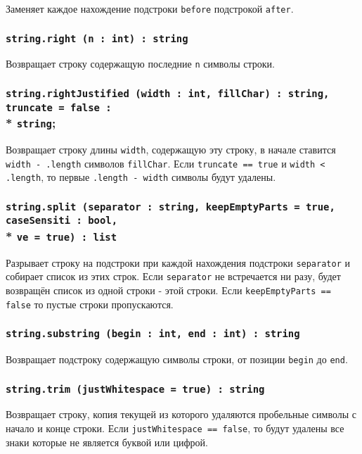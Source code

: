 Заменяет каждое нахождение подстроки \texttt{before} подстрокой \texttt{after}.

\subsubsection{\texttt{string.right (n : int) : string}}

Возвращает строку содержащую последние \texttt{n} символы строки.

\subsubsection{\texttt{string.rightJustified (width : int, fillChar) : string, truncate = false :}\\* \texttt{string};}

Возвращает строку длины \texttt{width}, содержащую эту строку, в начале ставится \texttt{width - .length} символов \texttt{fillChar}. Если \texttt{truncate == true} и \texttt{width < .length}, то первые \texttt{.length - width} символы будут удалены.

\subsubsection{\texttt{string.split (separator : string, keepEmptyParts = true, caseSensiti : bool,}\\* \texttt{ve = true) : list}}

Разрывает строку на подстроки при каждой нахождения подстроки \texttt{separator} и собирает список из этих строк. Если \texttt{separator} не встречается ни разу, будет возвращён список из одной строки - этой строки. Если \texttt{keepEmptyParts == false} то пустые строки пропускаются.

\subsubsection{\texttt{string.substring (begin : int, end : int) : string}}

Возвращает подстроку содержащую символы строки, от позиции \texttt{begin} до \texttt{end}.

\subsubsection{\texttt{string.trim (justWhitespace = true) : string}}

Возвращает строку, копия текущей из которого удаляются пробельные символы с начало и конце строки. Если \texttt{justWhitespace == false}, то будут удалены все знаки которые не является буквой или цифрой.


